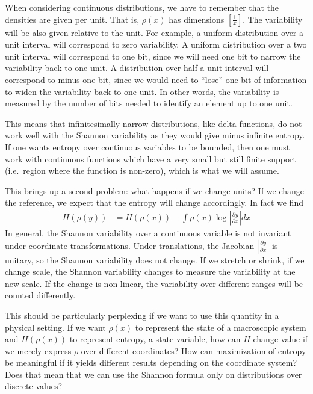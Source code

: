 \documentclass[prb, twocolumn]{revtex4-1}
\begin{document}
When considering continuous distributions, we have to remember that the densities are given per unit. That is, $\rho(x)$ has dimensions $[\frac{1}{x}]$. The variability will be also given relative to the unit. For example, a uniform distribution over a unit interval will correspond to zero variability. A uniform distribution over a two unit interval will correspond to one bit, since we will need one bit to narrow the variability back to one unit. A distribution over half a unit interval will correspond to minus one bit, since we would need to ``lose'' one bit of information to widen the variability back to one unit. In other words, the variability is measured by the number of bits needed to identify an element up to one unit.

This means that infinitesimally narrow distributions, like delta functions, do not work well with the Shannon variability as they would give minus infinite entropy. If one wants entropy over continuous variables to be bounded, then one must work with continuous functions which have a very small but still finite support (i.e.~region where the function is non-zero), which is what we will assume.

This brings up a second problem: what happens if we change units? If we change the reference, we expect that the entropy will change accordingly. In fact we find
\begin{equation}
\begin{aligned}
H(\rho(y)) &= H(\rho(x)) - \int \rho(x)  \log \left|\frac{\partial y}{\partial x}\right|  dx 
\end{aligned}
\end{equation}
In general, the Shannon variability over a continuous variable is not invariant under coordinate transformations. Under translations, the Jacobian $\left|\frac{\partial y}{\partial x}\right|$ is unitary, so the Shannon variability does not change. If we stretch or shrink, if we change scale, the Shannon variability changes to measure the variability at the new scale. If the change is non-linear, the variability over different ranges will be counted differently.

This should be particularly perplexing if we want to use this quantity in a physical setting. If we want $\rho(x)$ to represent the state of a macroscopic system and $H(\rho(x))$ to represent entropy, a state variable, how can $H$ change value if we merely express $\rho$ over different coordinates? How can maximization of entropy be meaningful if it yields different results depending on the coordinate system? Does that mean that we can use the Shannon formula only on distributions over discrete values?
\end{document}
